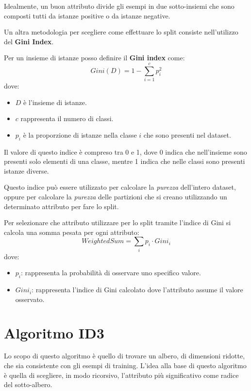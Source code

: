 Idealmente, un buon attributo divide gli esempi in due sotto-insiemi che sono composti tutti da istanze positive o da istanze negative.

Un altra metodologia per scegliere come effettuare lo split consiste nell'utilizzo del \textbf{Gini Index}.
\begin{definizione}
    Per un insieme di istanze posso definire il \textbf{Gini index} come:
    \begin{equation}
        Gini(D) = 1 - \sum_{i = 1}^c p_i^2
    \end{equation}
    dove: \begin{itemize}
        \item $D$ è l'insieme di istanze.
        \item $c$ rappresenta il numero di classi.
        \item $p_i$ è la proporzione di istanze nella classe $i$ che sono presenti nel dataset.
    \end{itemize}

    Il valore di questo indice è compreso tra 0 e 1, dove 0 indica che nell'insieme sono presenti solo elementi di una classe, mentre 1 indica che nelle classi sono presenti istanze diverse.
\end{definizione}
Questo indice può essere utilizzato per calcolare la \textit{purezza} dell'intero dataset, oppure per calcolare la \textit{purezza} delle partizioni che si creano utilizzando un determinato attributo per fare lo split.

Per selezionare che attributo utilizzare per lo split tramite l'indice di Gini si calcola una somma pesata per ogni attributo:
\begin{equation}
    WeightedSum = \sum_{i} p_i \cdot Gini_i
\end{equation}
dove:
\begin{itemize}
    \item $p_i$: rappresenta la probabilità di osservare uno specifico valore.
    \item $Gini_i$: rappresenta l'indice di Gini calcolato dove l'attributo assume il valore osservato.
\end{itemize}
\section{Algoritmo ID3}
Lo scopo di questo algoritmo è quello di trovare un albero, di dimensioni ridotte, che sia consistente con gli esempi di training. L'idea alla base di questo algoritmo è quella di scegliere, in modo ricorsivo, l'attributo più significativo come radice del sotto-albero.


